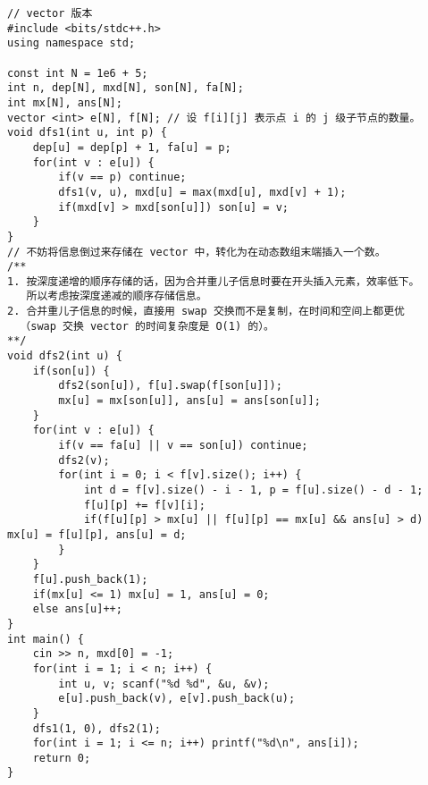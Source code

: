 \begin{verbatim}
// vector 版本
#include <bits/stdc++.h>
using namespace std;

const int N = 1e6 + 5;
int n, dep[N], mxd[N], son[N], fa[N];
int mx[N], ans[N];
vector <int> e[N], f[N]; // 设 f[i][j] 表示点 i 的 j 级子节点的数量。
void dfs1(int u, int p) {
    dep[u] = dep[p] + 1, fa[u] = p;
    for(int v : e[u]) {
        if(v == p) continue;
        dfs1(v, u), mxd[u] = max(mxd[u], mxd[v] + 1);
        if(mxd[v] > mxd[son[u]]) son[u] = v;
    }
}
// 不妨将信息倒过来存储在 vector 中，转化为在动态数组末端插入一个数。
/**
1. 按深度递增的顺序存储的话，因为合并重儿子信息时要在开头插入元素，效率低下。
   所以考虑按深度递减的顺序存储信息。
2. 合并重儿子信息的时候，直接用 swap 交换而不是复制，在时间和空间上都更优
  （swap 交换 vector 的时间复杂度是 O(1) 的）。
**/
void dfs2(int u) {
    if(son[u]) {
        dfs2(son[u]), f[u].swap(f[son[u]]);
        mx[u] = mx[son[u]], ans[u] = ans[son[u]];
    }
    for(int v : e[u]) {
        if(v == fa[u] || v == son[u]) continue;
        dfs2(v);
        for(int i = 0; i < f[v].size(); i++) {
            int d = f[v].size() - i - 1, p = f[u].size() - d - 1;
            f[u][p] += f[v][i];
            if(f[u][p] > mx[u] || f[u][p] == mx[u] && ans[u] > d) mx[u] = f[u][p], ans[u] = d;
        }
    } 
    f[u].push_back(1);
    if(mx[u] <= 1) mx[u] = 1, ans[u] = 0;
    else ans[u]++;
}
int main() {
    cin >> n, mxd[0] = -1;
    for(int i = 1; i < n; i++) {
        int u, v; scanf("%d %d", &u, &v);
        e[u].push_back(v), e[v].push_back(u);
    } 
    dfs1(1, 0), dfs2(1);
    for(int i = 1; i <= n; i++) printf("%d\n", ans[i]);
    return 0;
}
\end{verbatim}